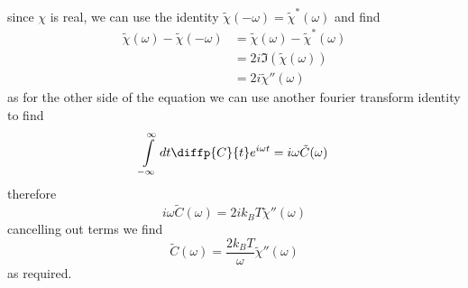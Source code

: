 since $\chi$ is real, we can use the identity $\tilde\chi(-\omega) = \tilde\chi^*(\omega)$ and find
\begin{align}
	\tilde\chi(\omega)-\tilde\chi(-\omega) &= \tilde\chi(\omega)-\tilde\chi^*(\omega)\\
	&= 2i\Im(\tilde\chi(\omega))\\
	&= 2i\tilde\chi''(\omega)
\end{align}
as for the other side of the equation we can use another fourier transform identity to find
\begin{equation}
	\int\limits_{-\infty}^\infty dt \diffp{C}{t}e^{i\omega t} = i\omega\tilde C(\omega)
\end{equation}
therefore
\begin{equation}
	i\omega\tilde C(\omega) = 2ik_BT\tilde\chi''(\omega)
\end{equation}
cancelling out terms we find
\begin{equation}
	\tilde C(\omega) = \frac{2k_BT}{\omega}\tilde\chi''(\omega)
\end{equation}
as required.